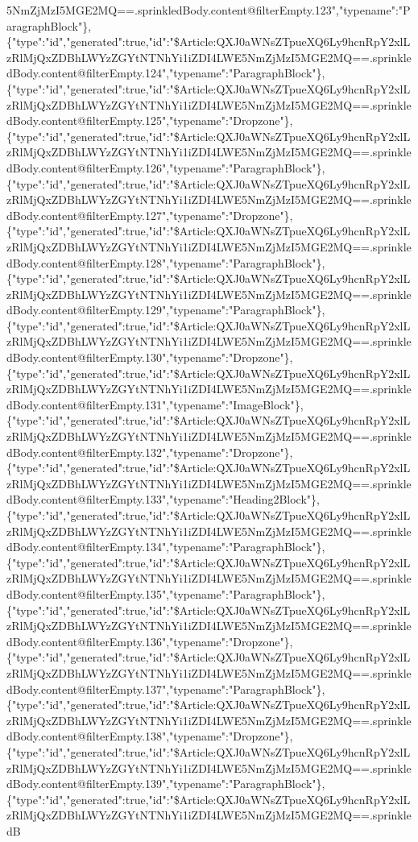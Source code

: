5NmZjMzI5MGE2MQ==.sprinkledBody.content@filterEmpty.123","typename":"ParagraphBlock"\},\{"type":"id","generated":true,"id":"\$Article:QXJ0aWNsZTpueXQ6Ly9hcnRpY2xlLzRlMjQxZDBhLWYzZGYtNTNhYi1iZDI4LWE5NmZjMzI5MGE2MQ==.sprinkledBody.content@filterEmpty.124","typename":"ParagraphBlock"\},\{"type":"id","generated":true,"id":"\$Article:QXJ0aWNsZTpueXQ6Ly9hcnRpY2xlLzRlMjQxZDBhLWYzZGYtNTNhYi1iZDI4LWE5NmZjMzI5MGE2MQ==.sprinkledBody.content@filterEmpty.125","typename":"Dropzone"\},\{"type":"id","generated":true,"id":"\$Article:QXJ0aWNsZTpueXQ6Ly9hcnRpY2xlLzRlMjQxZDBhLWYzZGYtNTNhYi1iZDI4LWE5NmZjMzI5MGE2MQ==.sprinkledBody.content@filterEmpty.126","typename":"ParagraphBlock"\},\{"type":"id","generated":true,"id":"\$Article:QXJ0aWNsZTpueXQ6Ly9hcnRpY2xlLzRlMjQxZDBhLWYzZGYtNTNhYi1iZDI4LWE5NmZjMzI5MGE2MQ==.sprinkledBody.content@filterEmpty.127","typename":"Dropzone"\},\{"type":"id","generated":true,"id":"\$Article:QXJ0aWNsZTpueXQ6Ly9hcnRpY2xlLzRlMjQxZDBhLWYzZGYtNTNhYi1iZDI4LWE5NmZjMzI5MGE2MQ==.sprinkledBody.content@filterEmpty.128","typename":"ParagraphBlock"\},\{"type":"id","generated":true,"id":"\$Article:QXJ0aWNsZTpueXQ6Ly9hcnRpY2xlLzRlMjQxZDBhLWYzZGYtNTNhYi1iZDI4LWE5NmZjMzI5MGE2MQ==.sprinkledBody.content@filterEmpty.129","typename":"ParagraphBlock"\},\{"type":"id","generated":true,"id":"\$Article:QXJ0aWNsZTpueXQ6Ly9hcnRpY2xlLzRlMjQxZDBhLWYzZGYtNTNhYi1iZDI4LWE5NmZjMzI5MGE2MQ==.sprinkledBody.content@filterEmpty.130","typename":"Dropzone"\},\{"type":"id","generated":true,"id":"\$Article:QXJ0aWNsZTpueXQ6Ly9hcnRpY2xlLzRlMjQxZDBhLWYzZGYtNTNhYi1iZDI4LWE5NmZjMzI5MGE2MQ==.sprinkledBody.content@filterEmpty.131","typename":"ImageBlock"\},\{"type":"id","generated":true,"id":"\$Article:QXJ0aWNsZTpueXQ6Ly9hcnRpY2xlLzRlMjQxZDBhLWYzZGYtNTNhYi1iZDI4LWE5NmZjMzI5MGE2MQ==.sprinkledBody.content@filterEmpty.132","typename":"Dropzone"\},\{"type":"id","generated":true,"id":"\$Article:QXJ0aWNsZTpueXQ6Ly9hcnRpY2xlLzRlMjQxZDBhLWYzZGYtNTNhYi1iZDI4LWE5NmZjMzI5MGE2MQ==.sprinkledBody.content@filterEmpty.133","typename":"Heading2Block"\},\{"type":"id","generated":true,"id":"\$Article:QXJ0aWNsZTpueXQ6Ly9hcnRpY2xlLzRlMjQxZDBhLWYzZGYtNTNhYi1iZDI4LWE5NmZjMzI5MGE2MQ==.sprinkledBody.content@filterEmpty.134","typename":"ParagraphBlock"\},\{"type":"id","generated":true,"id":"\$Article:QXJ0aWNsZTpueXQ6Ly9hcnRpY2xlLzRlMjQxZDBhLWYzZGYtNTNhYi1iZDI4LWE5NmZjMzI5MGE2MQ==.sprinkledBody.content@filterEmpty.135","typename":"ParagraphBlock"\},\{"type":"id","generated":true,"id":"\$Article:QXJ0aWNsZTpueXQ6Ly9hcnRpY2xlLzRlMjQxZDBhLWYzZGYtNTNhYi1iZDI4LWE5NmZjMzI5MGE2MQ==.sprinkledBody.content@filterEmpty.136","typename":"Dropzone"\},\{"type":"id","generated":true,"id":"\$Article:QXJ0aWNsZTpueXQ6Ly9hcnRpY2xlLzRlMjQxZDBhLWYzZGYtNTNhYi1iZDI4LWE5NmZjMzI5MGE2MQ==.sprinkledBody.content@filterEmpty.137","typename":"ParagraphBlock"\},\{"type":"id","generated":true,"id":"\$Article:QXJ0aWNsZTpueXQ6Ly9hcnRpY2xlLzRlMjQxZDBhLWYzZGYtNTNhYi1iZDI4LWE5NmZjMzI5MGE2MQ==.sprinkledBody.content@filterEmpty.138","typename":"Dropzone"\},\{"type":"id","generated":true,"id":"\$Article:QXJ0aWNsZTpueXQ6Ly9hcnRpY2xlLzRlMjQxZDBhLWYzZGYtNTNhYi1iZDI4LWE5NmZjMzI5MGE2MQ==.sprinkledBody.content@filterEmpty.139","typename":"ParagraphBlock"\},\{"type":"id","generated":true,"id":"\$Article:QXJ0aWNsZTpueXQ6Ly9hcnRpY2xlLzRlMjQxZDBhLWYzZGYtNTNhYi1iZDI4LWE5NmZjMzI5MGE2MQ==.sprinkledB